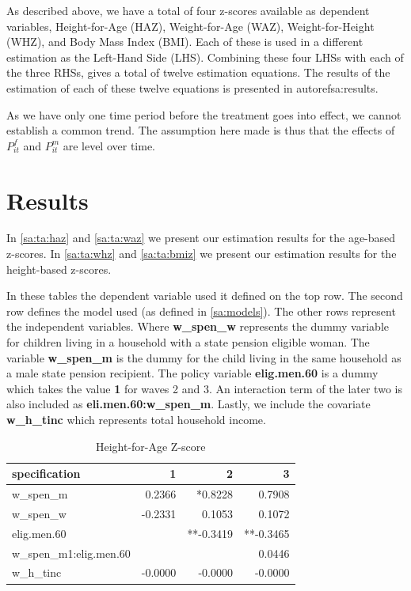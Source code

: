 \begin{refsection}
As described above, we have a total of four z-scores available as dependent variables, Height-for-Age (HAZ), Weight-for-Age (WAZ), Weight-for-Height (WHZ), and Body Mass Index (BMI). Each of these is used in a different estimation as the Left-Hand Side (LHS).
Combining these four LHSs with each of the three RHSs, gives a total of twelve estimation equations.
The results of the estimation of each of these twelve equations is presented in autoref{sa:results}.

As we have only one time period before the treatment goes into effect,
we cannot establish a common trend.
The assumption here made is thus that the effects of $P^f_{it}$ and $P^m_{it}$ are level over time.


\section{Results}
\label{sa:results}
In \autoref{sa:ta:haz} and \autoref{sa:ta:waz} we present our estimation results for the age-based z-scores.
In \autoref{sa:ta:whz} and \autoref{sa:ta:bmiz} we present our estimation results for the height-based z-scores.

In these tables the dependent variable used it defined on the top row.
The second row defines the model used (as defined in \autoref{sa:models}).
The other rows represent the independent variables.
Where \textbf{w\_spen\_w} represents the dummy variable for children living in a household with a state pension eligible woman.
The variable \textbf{w\_spen\_m} is the dummy for the child living in the same household as a male state pension recipient.
The policy variable \textbf{elig.men.60} is a dummy which takes the value \textbf{1} for waves 2 and 3.
An interaction term of the later two is also included as \textbf{eli.men.60:w\_spen\_m}.
Lastly, we include the covariate \textbf{w\_h\_tinc} which represents total household income.

\begin{table}[!ht]
\centering
\caption{Height-for-Age Z-score}
\label{sa:ta:haz}
\begin{tabular}{l|rrr}
\hline
specification & 1 & 2 & 3\\
\hline
w\_spen\_m & 0.2366 & *0.8228 & 0.7908 \\
w\_spen\_w & -0.2331 & 0.1053 & 0.1072 \\
elig.men.60 & & **-0.3419 & **-0.3465 \\
w\_spen\_m1:elig.men.60 & & & 0.0446 \\
w\_h\_tinc & -0.0000 & -0.0000 & -0.0000 \\
\end{tabular}
\end{table}


\end{refsection}
